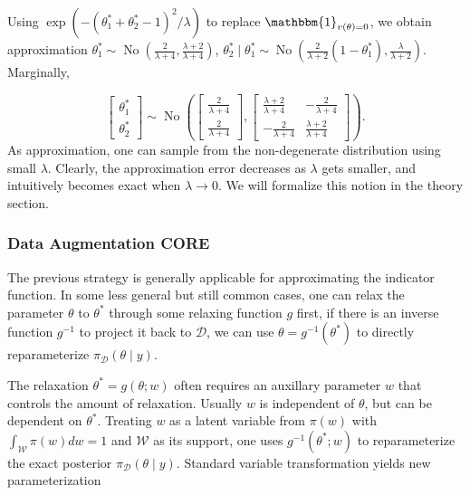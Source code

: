 \documentclass[10pt,fleqn]{article}
\newcommand{\mc}[1]{\mathcal{#1}}
\DeclareMathOperator{\No}{No}
\DeclareMathOperator{\1}{\mathbbm{1}}
\begin{document}
Using $ \exp( - (\theta^*_1+\theta^*_2-1)^2/\lambda)$ to
replace $\mathbbm{1}_{v(\theta)=0}$, we obtain approximation $\theta^*_1 \sim \No(\frac{2}{\lambda+4},\frac{\lambda+2}{\lambda+4})$, $\theta^*_2\mid \theta^*_1 \sim \No(\frac{2}{\lambda+2}(1-\theta^*_1),\frac{\lambda}{\lambda+2})$. Marginally, 

$$\begin{bmatrix} \theta^*_1 \\ \theta^*_2 \end{bmatrix} \sim
\No \left(
\begin{bmatrix} \frac{2}{\lambda+4} \\ \frac{2}{\lambda+4} \end{bmatrix},
\begin{bmatrix} \frac{\lambda+2}{\lambda+4} & -\frac{2}{\lambda+4}  \\  -\frac{2}{\lambda+4}  &\frac{\lambda+2}{\lambda+4} \end{bmatrix}
\right).$$
As approximation, one can sample from the non-degenerate distribution using small $\lambda$. Clearly, the approximation error decreases as $\lambda$ gets
smaller, and intuitively becomes exact when $\lambda\rightarrow 0$. We will formalize
this notion in the theory section.

\subsubsection{Data Augmentation CORE}

The previous strategy is generally applicable for approximating the indicator
function. In some less general but
still common cases, one can relax the parameter $\theta$ to $\theta^*$ through some relaxing function
$g$ first, if there is an inverse function $g^{-1}$ to project it back to
$\mc D$, we can use $\theta=g^{-1}(\theta^*)$ to directly reparameterize $\pi_{\mc D}(\theta\mid y)$.


The relaxation $\theta^*=g(\theta;w)$ often requires an auxillary parameter
$w$ that controls the amount of relaxation. Usually $w$ is independent of $\theta$, but can be dependent on $\theta^*$. Treating $w$ as a latent variable from $\pi(w)$  with $\int_{\mc W} \pi(w) dw =1$ and $\mc W$ as
its support, one uses $g^{-1}(\theta^*;w)$ to reparameterize the exact posterior $\pi_{\mc D}(\theta\mid y)$.
Standard variable transformation yields new parameterization
\end{document}
